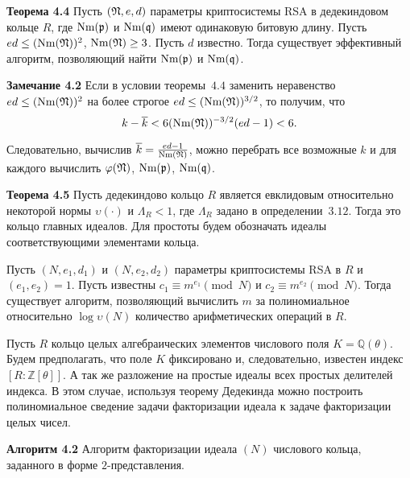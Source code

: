 \documentclass[_00_autoref.tex]{subfiles}
\begin{document}
\textbf{Теорема 4.4}\label{theorem:d_is_known_2}
    Пусть $(\mathfrak{N}, e, d)$ параметры криптосистемы RSA в дедекиндовом кольце $R$, где $\textrm{Nm}(\mathfrak{p})$ и $\textrm{Nm}(\mathfrak{q})$ имеют одинаковую битовую длину.
    Пусть $e d \le (\textrm{Nm}(\mathfrak{N}))^2$, $\textrm{Nm}(\mathfrak{N}) \ge 3$.
    Пусть $d$ известно.
    Тогда существует эффективный алгоритм, позволяющий найти $\textrm{Nm}(\mathfrak{p})$ и $\textrm{Nm}(\mathfrak{q})$.

\textbf{Замечание 4.2}
    Если в условии теоремы~$4.4$ заменить неравенство $ed \le (\textrm{Nm}(\mathfrak{N}))^2$ на более строгое $e d \le (\textrm{Nm}(\mathfrak{N}))^{3/2}$, то получим, что
    \begin{equation*}
        k - \overline{k} < 6(\textrm{Nm}(\mathfrak{N}))^{-3/2}(ed-1) < 6.
    \end{equation*}
    
    Следовательно, вычислив $\overline{k} = \frac{ed-1}{\textrm{Nm}(\mathfrak{N})}$, можно перебрать все возможные $k$ и для каждого вычислить $\varphi(\mathfrak{N})$, $\textrm{Nm}(\mathfrak{p})$, $\textrm{Nm}(\mathfrak{q})$.

\textbf{Теорема 4.5}
    Пусть дедекиндово кольцо $R$ является евклидовым относительно некоторой нормы $\upsilon(\cdot)$ и $\Lambda_{R} < 1$, где $\Lambda_{R}$ задано в определении~$3.12$.
    Тогда это кольцо главных идеалов.
    Для простоты будем обозначать идеалы соответствующими элементами кольца.

    Пусть $(N, e_1, d_1)$ и $(N, e_2, d_2)$ параметры криптосистемы RSA в $R$ и $(e_1, e_2) = 1$.
    Пусть известны $c_1 \equiv m^{e_1} \pmod{N}$ и $c_2 \equiv m^{e_2} \pmod{N}$.
    Тогда существует алгоритм, позволяющий вычислить $m$ за полиномиальное относительно $\log \upsilon(N)$ количество арифметических операций в $R$.


Пусть $R$ кольцо целых алгебраических элементов числового поля $K = \mathbb{Q}(\theta)$.
Будем предполагать, что поле $K$ фиксировано и, следовательно, известен индекс $[R: \mathbb{Z}[\theta]]$.
А так же разложение на простые идеалы всех простых делителей индекса.
В этом случае, используя теорему Дедекинда можно построить полиномиальное сведение задачи факторизации идеала к задаче факторизации целых чисел.

\textbf{Алгоритм 4.2}
    Алгоритм факторизации идеала $(N)$ числового кольца, заданного в форме $2$-представления.
\end{document}

